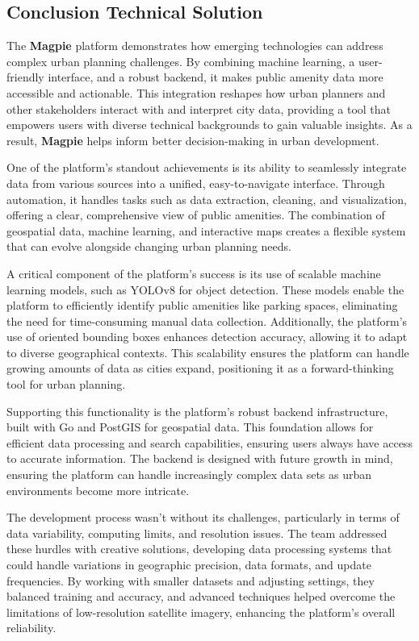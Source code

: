 \newpage{}

\subsection{Conclusion Technical Solution}

The \textbf{Magpie} platform demonstrates how emerging technologies can address
complex urban planning challenges. By combining machine learning, a
user{-}friendly interface, and a robust backend, it makes public amenity data
more accessible and actionable. This integration reshapes how urban planners and
other stakeholders interact with and interpret city data, providing a tool that
empowers users with diverse technical backgrounds to gain valuable insights. As
a result, \textbf{Magpie} helps inform better decision{-}making in urban
development.

One of the platform's standout achievements is its ability to seamlessly
integrate data from various sources into a unified, easy{-}to{-}navigate
interface. Through automation, it handles tasks such as data extraction,
cleaning, and visualization, offering a clear, comprehensive view of public
amenities. The combination of geospatial data, machine learning, and interactive
maps creates a flexible system that can evolve alongside changing urban planning
needs.

A critical component of the platform's success is its use of scalable machine
learning models, such as YOLOv8 for object detection. These models enable the
platform to efficiently identify public amenities like parking spaces,
eliminating the need for time{-}consuming manual data collection. Additionally,
the platform's use of oriented bounding boxes enhances detection accuracy,
allowing it to adapt to diverse geographical contexts. This scalability ensures
the platform can handle growing amounts of data as cities expand, positioning it
as a forward{-}thinking tool for urban planning.

Supporting this functionality is the platform's robust backend infrastructure,
built with Go and PostGIS for geospatial data. This foundation allows for
efficient data processing and search capabilities, ensuring users always have
access to accurate information. The backend is designed with future growth in
mind, ensuring the platform can handle increasingly complex data sets as urban
environments become more intricate.

The development process wasn't without its challenges, particularly in terms of
data variability, computing limits, and resolution issues. The team addressed
these hurdles with creative solutions, developing data processing systems that
could handle variations in geographic precision, data formats, and update
frequencies. By working with smaller datasets and adjusting settings, they
balanced training and accuracy, and advanced techniques helped overcome the
limitations of low{-}resolution satellite imagery, enhancing the platform's
overall reliability.

